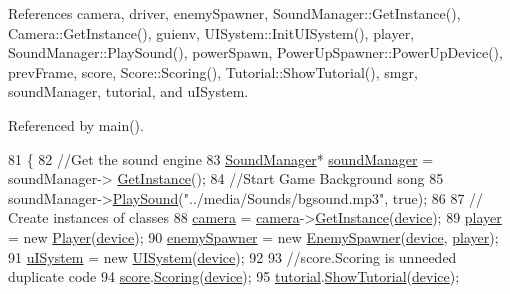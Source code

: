 References camera, driver, enemy\-Spawner, Sound\-Manager\-::\-Get\-Instance(), Camera\-::\-Get\-Instance(), guienv, U\-I\-System\-::\-Init\-U\-I\-System(), player, Sound\-Manager\-::\-Play\-Sound(), power\-Spawn, Power\-Up\-Spawner\-::\-Power\-Up\-Device(), prev\-Frame, score, Score\-::\-Scoring(), Tutorial\-::\-Show\-Tutorial(), smgr, sound\-Manager, tutorial, and u\-I\-System.



Referenced by main().


\begin{DoxyCode}
81 \{
82     \textcolor{comment}{//Get the sound engine}
83     \hyperlink{class_sound_manager}{SoundManager}* \hyperlink{_player_8cpp_aa536d458e5b766e20ac204a4ab09cc36}{soundManager} = soundManager->
      \hyperlink{class_sound_manager_a887480b38c9380c9fba23a2337df63be}{GetInstance}();
84     \textcolor{comment}{//Start Game Background song    }
85     soundManager->\hyperlink{class_sound_manager_a81e8f88fe549f6767d3552f12c28ecbc}{PlaySound}(\textcolor{stringliteral}{"../media/Sounds/bgsound.mp3"}, \textcolor{keyword}{true});
86 
87     \textcolor{comment}{// Create instances of classes}
88     \hyperlink{_game_8cpp_af95833c961e5bd20dcd54e1d46a03c0b}{camera} = \hyperlink{_game_8cpp_af95833c961e5bd20dcd54e1d46a03c0b}{camera}->\hyperlink{class_camera_aae2256f0ee62dd982d92c09d9d00c8d5}{GetInstance}(\hyperlink{class_game_a4968552e2ba3037d494596a908eccc00}{device});
89     \hyperlink{class_game_abec70aa1c0269a9a7e171af4d79e08bf}{player} = \textcolor{keyword}{new} \hyperlink{class_player}{Player}(\hyperlink{class_game_a4968552e2ba3037d494596a908eccc00}{device});
90     \hyperlink{_game_8cpp_a78dc0d7de0179cebaebf79df72c6070f}{enemySpawner} = \textcolor{keyword}{new} \hyperlink{class_enemy_spawner}{EnemySpawner}(\hyperlink{class_game_a4968552e2ba3037d494596a908eccc00}{device}, \hyperlink{class_game_abec70aa1c0269a9a7e171af4d79e08bf}{player});
91     \hyperlink{_game_8cpp_a968f4669d04899e10a3f52223cd20811}{uISystem} = \textcolor{keyword}{new} \hyperlink{class_u_i_system}{UISystem}(\hyperlink{class_game_a4968552e2ba3037d494596a908eccc00}{device});
92 
93     \textcolor{comment}{//score.Scoring is unneeded duplicate code}
94     \hyperlink{_game_8cpp_a94014506ee2a0c05dcb878c5f6a1ce0f}{score}.\hyperlink{class_score_ae8d4105bea77e4bfcd77c347e0a9dd8c}{Scoring}(\hyperlink{class_game_a4968552e2ba3037d494596a908eccc00}{device});
95     \hyperlink{_game_8cpp_ae2e07e9072887b6ad4c087d948f1a431}{tutorial}.\hyperlink{class_tutorial_a2bcccb05a09cfb9cd14fb456a609c50b}{ShowTutorial}(\hyperlink{class_game_a4968552e2ba3037d494596a908eccc00}{device});

\end{DoxyCode}
